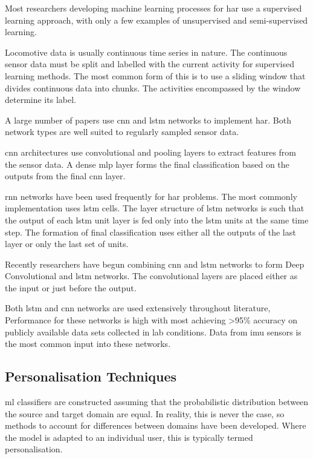 Most researchers developing machine learning processes for \acrshort{har} use a supervised learning approach\cite{Saini2020, Straczkiewicz2021}, with only a few examples of unsupervised and semi-supervised learning\cite{Bota2019}.

Locomotive data is usually continuous time series in nature. The continuous sensor data must be split and labelled with the current activity for supervised learning methods. The most common form of this is to use a sliding window that divides continuous data into chunks. The activities encompassed by the window determine its label.

A large number of papers use \acrfull{cnn} and \acrfull{lstm} networks to implement \acrshort{har}. Both network types are well suited to regularly sampled sensor data.

\acrshort{cnn} architectures use convolutional and pooling layers to extract features from the sensor data. A dense \acrshort{mlp} layer forms the final classification based on the outputs from the final \acrshort{cnn} layer.\cite{Jiang2015, Lu2020, Martinez-Hernandez2021}

\acrshort{rnn} networks have been used frequently for \acrshort{har} problems. The most commonly implementation uses \acrshort{lstm} cells. The layer structure of \acrshort{lstm} networks is such that the output of each \acrshort{lstm} unit layer is fed only into the \acrshort{lstm} units at the same time step. The formation of final classification uses either all the outputs of the last layer or only the last set of units.\cite{Yu2018, Uddin2021a}

Recently researchers have begun combining \acrshort{cnn} and \acrshort{lstm} networks to form Deep Convolutional and \acrshort{lstm} networks\cite{Ordonez2016}. The convolutional layers are placed either as the input or just before the output.\cite{Mutegeki2020, Xia2020}

Both \acrshort{lstm} and \acrshort{cnn} networks are used extensively throughout literature, Performance for these networks is high with most achieving >95\% accuracy on publicly available data sets collected in lab conditions. Data from \acrshort{imu} sensors is the most common input into these networks.\cite{Murad2017, Su2019, Tufek2020, Xia2020,  Ma2021, Uddin2021a}

\subsection{Personalisation Techniques}
\label{sec:personalisation-related-works}
\acrshort{ml} classifiers are constructed assuming that the probabilistic distribution between the source and target domain are equal\cite{Farahani2020}. In reality, this is never the case, so methods to account for differences between domains have been developed. Where the model is adapted to an individual user, this is typically termed personalisation.

